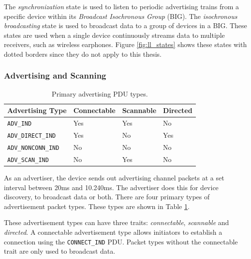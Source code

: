 The \textit{synchronization} state is used to listen to periodic advertising trains from a specific device within its \textit{Broadcast Isochronous Group} (BIG). The \textit{isochronous broadcasting} state is used to broadcast data to a group of devices in a BIG. These states are used when a single device continuously streams data to multiple receivers, such as wireless earphones. Figure \ref{fig:ll_states} shows these states with dotted borders since they do not apply to this thesis.

\subsubsection{Advertising and Scanning}
\begin{table}
    \begin{center}
    \begin{tabular}{|l|l|l|l|}
        \hline
        \textbf{Advertising Type} & \textbf{Connectable} & \textbf{Scannable} & \textbf{Directed} \\
        \hline
        \texttt{ADV\_IND} & Yes & Yes & No \\
        \hline
        \texttt{ADV\_DIRECT\_IND} & Yes & No & Yes \\
        \hline
        \texttt{ADV\_NONCONN\_IND} & No & No & No \\
        \hline
        \texttt{ADV\_SCAN\_IND} & No & Yes & No \\
        \hline
    \end{tabular}
    \end{center}
    \caption{Primary advertising PDU types.}
    \label{tbl:adv_types}
\end{table}

As an advertiser, the device sends out advertising channel packets at a set interval between 20ms and 10.240ms. The advertiser does this for device discovery, to broadcast data or both. There are four primary types of advertisement packet types. These types are shown in Table \ref{tbl:adv_types}.

These advertisement types can have three traits: \textit{connectable}, \textit{scannable} and \textit{directed}. A connectable advertisement type allows initiators to establish a connection using the \texttt{CONNECT\_IND} PDU. Packet types without the connectable trait are only used to broadcast data.

